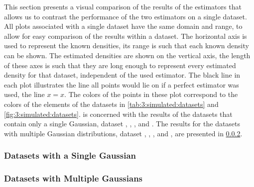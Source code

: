 This section presents a visual comparison of the results of the estimators that allows us to contrast the performance of the two estimators on a single dataset. 
All plots associated with a single dataset have the same domain and range, to allow for easy comparison of the results within a dataset. The horizontal axis is used to represent the known densities, its range is such that each known density can be shown. The estimated densities are shown on the vertical axis, the length of these axes is such that they are long enough to represent every estimated density for that dataset, independent of the used estimator. 
The black line in each plot illustrates the line all points would lie on if a perfect estimator was used, \ie the line $x = x$.
The colors of the points in these plot correspond to the colors of the elements of the datasets in \cref{tab:3:simulated:datasets} and \cref{fig:3:simulated:datasets}. 
 is concerned with the results of the datasets that contain only a single Gaussian, \ie dataset \ferdosiOne, \baakmanOne, \baakmanFour, and \baakmanFive. The results for the datasets with multiple Gaussian distributions, \ie dataset \ferdosiTwo, \baakmanTwo, \ferdosiThree, and \baakmanThree, are presented in \cref{s:results:plots:multipleGaussians}.

\subsubsection{Datasets with a Single Gaussian}
	\label{s:results:plots:singleGaussian}
	


\subsubsection{Datasets with Multiple Gaussians}
	\label{s:results:plots:multipleGaussians}
	


